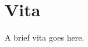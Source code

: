 \documentclass[final]{ukthesis}
\begin{document}
\tableofcontents\clearpage
\listoffigures\clearpage
\listoftables\clearpage


\mainmatter


\copyrightnotice


\copyrightnotice


\copyrightnotice


\backmatter

\printbibliography[title={References}]
%
%

\chapter{Vita}
A brief vita goes here.
\end{document}
